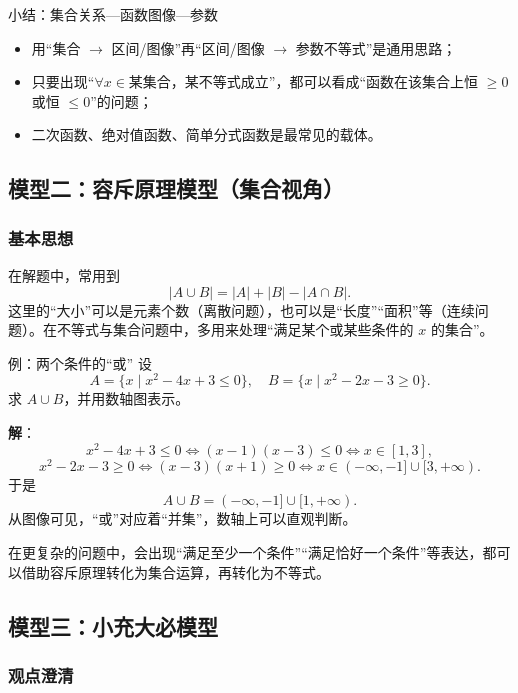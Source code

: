 \documentclass[a4paper,11pt]{ctexart}
\begin{document}
\begin{summarybox}{小结：集合关系—函数图像—参数}
\begin{itemize}
  \item 用“集合 $\rightarrow$ 区间/图像”再“区间/图像 $\rightarrow$ 参数不等式”是通用思路；
  \item 只要出现“$\forall x\in\text{某集合}$，某不等式成立”，都可以看成“函数在该集合上恒 $\ge0$ 或恒 $\le0$”的问题；
  \item 二次函数、绝对值函数、简单分式函数是最常见的载体。
\end{itemize}
\end{summarybox}

\subsection{模型二：容斥原理模型（集合视角）}

\subsubsection*{基本思想}

在解题中，常用到
\[
|A\cup B|=|A|+|B|-|A\cap B|.
\]
这里的“大小”可以是元素个数（离散问题），也可以是“长度”“面积”等（连续问题）。在不等式与集合问题中，多用来处理“满足某个或某些条件的 $x$ 的集合”。

\begin{examplebox}[mathnote coverage=soft]{例：两个条件的“或”}
设
\[
A=\{x\mid x^2-4x+3\le 0\},\quad
B=\{x\mid x^2-2x-3\ge 0\}.
\]
求 $A\cup B$，并用数轴图表示。

\textbf{解}：
\[
x^2-4x+3\le 0\iff (x-1)(x-3)\le 0\iff x\in[1,3],
\]
\[
x^2-2x-3\ge 0\iff (x-3)(x+1)\ge 0\iff x\in(-\infty,-1]\cup[3,+\infty).
\]
于是
\[
A\cup B=(-\infty,-1]\cup[1,+\infty).
\]
从图像可见，“或”对应着“并集”，数轴上可以直观判断。
\end{examplebox}

在更复杂的问题中，会出现“满足至少一个条件”“满足恰好一个条件”等表达，都可以借助容斥原理转化为集合运算，再转化为不等式。

\subsection{模型三：小充大必模型}

\subsubsection*{观点澄清}
\end{document}
